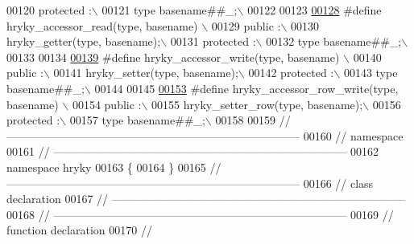\begin{DoxyCode}
00120 \textcolor{preprocessor}{    protected :\(\backslash\)}
00121 \textcolor{preprocessor}{        type basename##\_;\(\backslash\)}
00122 \textcolor{preprocessor}{}
00123 \textcolor{preprocessor}{}
\hypertarget{common_8h_source_l00128}{}\hyperlink{common_8h_aa006947a022e09b05cfdf88588cd72eb}{00128} \textcolor{preprocessor}{#define hryky\_accessor\_read(type, basename) \(\backslash\)}
00129 \textcolor{preprocessor}{    public :\(\backslash\)}
00130 \textcolor{preprocessor}{        hryky\_getter(type, basename);\(\backslash\)}
00131 \textcolor{preprocessor}{    protected :\(\backslash\)}
00132 \textcolor{preprocessor}{        type basename##\_;\(\backslash\)}
00133 \textcolor{preprocessor}{}
00134 \textcolor{preprocessor}{}
\hypertarget{common_8h_source_l00139}{}\hyperlink{common_8h_a3bd7ca3bde3227a8dc2207a3229d5330}{00139} \textcolor{preprocessor}{#define hryky\_accessor\_write(type, basename) \(\backslash\)}
00140 \textcolor{preprocessor}{    public :\(\backslash\)}
00141 \textcolor{preprocessor}{        hryky\_setter(type, basename);\(\backslash\)}
00142 \textcolor{preprocessor}{    protected :\(\backslash\)}
00143 \textcolor{preprocessor}{        type basename##\_;\(\backslash\)}
00144 \textcolor{preprocessor}{}
00145 \textcolor{preprocessor}{}
\hypertarget{common_8h_source_l00153}{}\hyperlink{common_8h_aea6c22c6bcc25a46e463aa05bbc6a4e3}{00153} \textcolor{preprocessor}{#define hryky\_accessor\_row\_write(type, basename) \(\backslash\)}
00154 \textcolor{preprocessor}{    public :\(\backslash\)}
00155 \textcolor{preprocessor}{        hryky\_setter\_row(type, basename);\(\backslash\)}
00156 \textcolor{preprocessor}{    protected :\(\backslash\)}
00157 \textcolor{preprocessor}{        type basename##\_;\(\backslash\)}
00158 \textcolor{preprocessor}{}
00159 \textcolor{preprocessor}{}\textcolor{comment}{//
      ------------------------------------------------------------------------------}
00160 \textcolor{comment}{// namespace}
00161 \textcolor{comment}{//
      ------------------------------------------------------------------------------}
00162 \textcolor{keyword}{namespace }hryky
00163 \{
00164 \}
00165 \textcolor{comment}{//
      ------------------------------------------------------------------------------}
00166 \textcolor{comment}{// class declaration}
00167 \textcolor{comment}{//
      ------------------------------------------------------------------------------}
00168 \textcolor{comment}{//
      ------------------------------------------------------------------------------}
00169 \textcolor{comment}{// function declaration}
00170 \textcolor{comment}{//
}
\end{DoxyCode}
